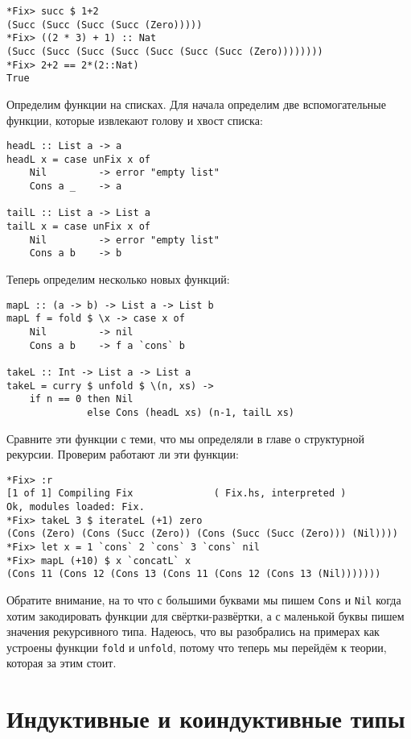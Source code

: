 \begin{verbatim}
*Fix> succ $ 1+2
(Succ (Succ (Succ (Succ (Zero)))))
*Fix> ((2 * 3) + 1) :: Nat
(Succ (Succ (Succ (Succ (Succ (Succ (Succ (Zero))))))))
*Fix> 2+2 == 2*(2::Nat)
True
\end{verbatim}

Определим функции на списках. Для начала определим две вспомогательные
функции, которые извлекают голову и хвост списка:

\begin{verbatim}
headL :: List a -> a
headL x = case unFix x of
    Nil         -> error "empty list"
    Cons a _    -> a

tailL :: List a -> List a
tailL x = case unFix x of
    Nil         -> error "empty list"
    Cons a b    -> b
\end{verbatim}

Теперь определим несколько новых функций:

\begin{verbatim}
mapL :: (a -> b) -> List a -> List b
mapL f = fold $ \x -> case x of
    Nil         -> nil
    Cons a b    -> f a `cons` b

takeL :: Int -> List a -> List a
takeL = curry $ unfold $ \(n, xs) -> 
    if n == 0 then Nil
              else Cons (headL xs) (n-1, tailL xs)
\end{verbatim}

Сравните эти функции с теми, что мы определяли в главе о структурной
рекурсии. Проверим работают ли эти функции:

\begin{verbatim}
*Fix> :r
[1 of 1] Compiling Fix              ( Fix.hs, interpreted )
Ok, modules loaded: Fix.
*Fix> takeL 3 $ iterateL (+1) zero
(Cons (Zero) (Cons (Succ (Zero)) (Cons (Succ (Succ (Zero))) (Nil))))
*Fix> let x = 1 `cons` 2 `cons` 3 `cons` nil
*Fix> mapL (+10) $ x `concatL` x
(Cons 11 (Cons 12 (Cons 13 (Cons 11 (Cons 12 (Cons 13 (Nil)))))))
\end{verbatim}

Обратите внимание, на то что с большими буквами мы пишем \texttt{Cons} и
\texttt{Nil} когда хотим закодировать функции для свёртки-развёртки, а с
маленькой буквы пишем значения рекурсивного типа. Надеюсь, что вы
разобрались на примерах как устроены функции \texttt{fold} и
\texttt{unfold}, потому что теперь мы перейдём к теории, которая за этим
стоит.

\section{Индуктивные и коиндуктивные типы}

